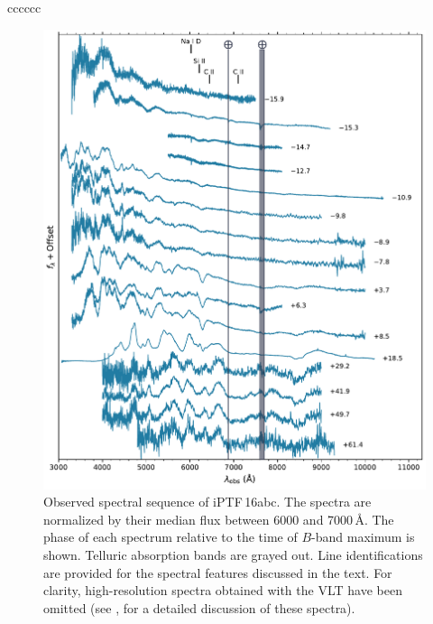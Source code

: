 \documentclass[twocolumn]{aastex61}
\newcommand{\abc}{iPTF\,16abc}
\begin{document}
\begin{deluxetable}{cccccc}
  \enddata
\end{deluxetable}

\begin{figure}[!htb]
  \centering
  \includegraphics[width=5.5in]{spectra.pdf}
  \caption{
  Observed spectral sequence of \abc. The spectra are normalized by their
  median flux between 6000 and 7000$\,\textrm{\AA}$. The phase of each
  spectrum relative to the time of $B$-band maximum is shown.
  Telluric absorption bands are grayed out. Line identifications are provided
  for the spectral features discussed in the text. For clarity,
  high-resolution spectra obtained with the VLT have been omitted (see
  \citealt{2017A&A...606A.111F}, for a detailed discussion of these spectra).}
  \label{fig:spec_seq}
\end{figure}
\end{document}
